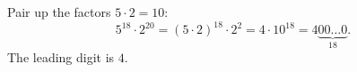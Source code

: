 Pair up the factors $5\cdot2=10$:
\[
5^{18}\cdot2^{20}=(5\cdot2)^{18}\cdot2^2=4\cdot10^{18}=4\underbrace{00\ldots0}_{18}.
\]
The leading digit is $\boxed{4}$.
